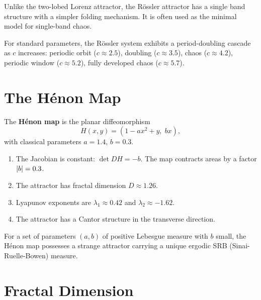 \begin{remark}
Unlike the two-lobed Lorenz attractor, the R\"ossler attractor has a single
band structure with a simpler folding mechanism. It is often used as the
minimal model for single-band chaos.
\end{remark}

\begin{proposition}
For standard parameters, the R\"ossler system exhibits a period-doubling
cascade as $c$ increases: periodic orbit ($c \approx 2.5$), doubling
($c \approx 3.5$), chaos ($c \approx 4.2$), periodic window ($c \approx 5.2$),
fully developed chaos ($c \approx 5.7$).
\end{proposition}

\section{The H\'enon Map}

\begin{definition}
The \textbf{H\'enon map} is the planar diffeomorphism
\[
    H(x, y) = (1 - ax^2 + y,\; bx),
\]
with classical parameters $a = 1.4$, $b = 0.3$.
\end{definition}

\begin{proposition}
\begin{enumerate}
    \item The Jacobian is constant: $\det DH = -b$. The map contracts areas
    by a factor $\left| b \right| = 0.3$.
    \item The attractor has fractal dimension $D \approx 1.26$.
    \item Lyapunov exponents are $\lambda_1 \approx 0.42$ and $\lambda_2 \approx -1.62$.
    \item The attractor has a Cantor structure in the transverse direction.
\end{enumerate}
\end{proposition}

\begin{theorem}
For a set of parameters $(a, b)$ of positive Lebesgue measure with $b$ small,
the H\'enon map possesses a strange attractor carrying a unique ergodic SRB
(Sinai-Ruelle-Bowen) measure.
\end{theorem}

\section{Fractal Dimension}

